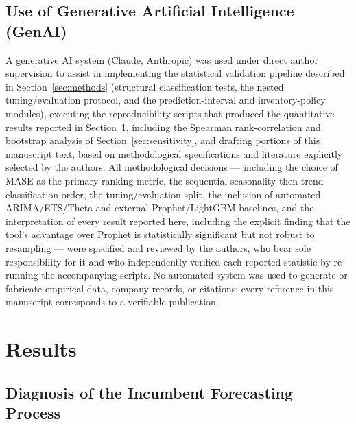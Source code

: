 \documentclass[forecasting,article,submit,pdftex,moreauthors]{Definitions/mdpi}
\begin{document}
\subsection{Use of Generative Artificial Intelligence (GenAI)}
\label{sec:genai}
A generative AI system (Claude, Anthropic) was used under direct author supervision to assist in implementing the statistical validation pipeline described in Section~\ref{sec:methods} (structural classification tests, the nested tuning/evaluation protocol, and the prediction-interval and inventory-policy modules), executing the reproducibility scripts that produced the quantitative results reported in Section~\ref{sec:results}, including the Spearman rank-correlation and bootstrap analysis of Section~\ref{sec:sensitivity}, and drafting portions of this manuscript text, based on methodological specifications and literature explicitly selected by the authors. All methodological decisions --- including the choice of MASE as the primary ranking metric, the sequential seasonality-then-trend classification order, the tuning/evaluation split, the inclusion of automated ARIMA/ETS/Theta and external Prophet/LightGBM baselines, and the interpretation of every result reported here, including the explicit finding that the tool's advantage over Prophet is statistically significant but not robust to resampling --- were specified and reviewed by the authors, who bear sole responsibility for it and who independently verified each reported statistic by re-running the accompanying scripts. No automated system was used to generate or fabricate empirical data, company records, or citations; every reference in this manuscript corresponds to a verifiable publication.

\section{Results}
\label{sec:results}

\subsection{Diagnosis of the Incumbent Forecasting Process}
\label{sec:diagnosis}
\end{document}
